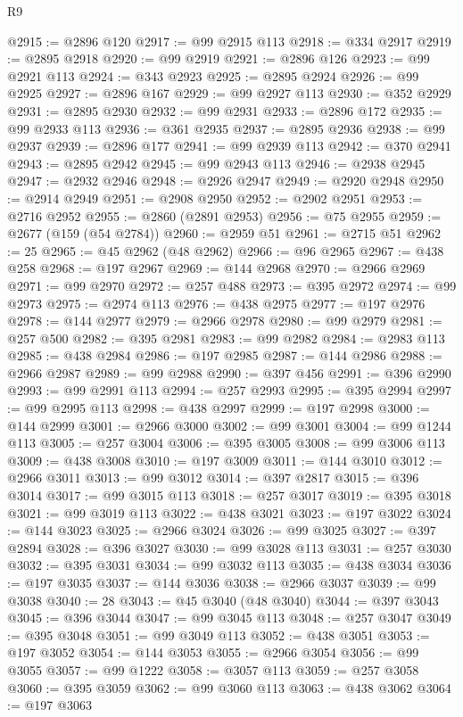 \begin{lexlean}{R9}
\begin{coremodule}
@2915 := @2896 @120
@2917 := @99 @2915 @113
@2918 := @334 @2917
@2919 := @2895 @2918
@2920 := @99 @2919
@2921 := @2896 @126
@2923 := @99 @2921 @113
@2924 := @343 @2923
@2925 := @2895 @2924
@2926 := @99 @2925
@2927 := @2896 @167
@2929 := @99 @2927 @113
@2930 := @352 @2929
@2931 := @2895 @2930
@2932 := @99 @2931
@2933 := @2896 @172
@2935 := @99 @2933 @113
@2936 := @361 @2935
@2937 := @2895 @2936
@2938 := @99 @2937
@2939 := @2896 @177
@2941 := @99 @2939 @113
@2942 := @370 @2941
@2943 := @2895 @2942
@2945 := @99 @2943 @113
@2946 := @2938 @2945
@2947 := @2932 @2946
@2948 := @2926 @2947
@2949 := @2920 @2948
@2950 := @2914 @2949
@2951 := @2908 @2950
@2952 := @2902 @2951
@2953 := @2716 @2952
@2955 := @2860 (@2891 @2953)
@2956 := @75 @2955
@2959 := @2677 (@159 (@54 @2784))
@2960 := @2959 @51
@2961 := @2715 @51
@2962 := 25
@2965 := @45 @2962 (@48 @2962)
@2966 := @96 @2965
@2967 := @438 @258
@2968 := @197 @2967
@2969 := @144 @2968
@2970 := @2966 @2969
@2971 := @99 @2970
@2972 := @257 @488
@2973 := @395 @2972
@2974 := @99 @2973
@2975 := @2974 @113
@2976 := @438 @2975
@2977 := @197 @2976
@2978 := @144 @2977
@2979 := @2966 @2978
@2980 := @99 @2979
@2981 := @257 @500
@2982 := @395 @2981
@2983 := @99 @2982
@2984 := @2983 @113
@2985 := @438 @2984
@2986 := @197 @2985
@2987 := @144 @2986
@2988 := @2966 @2987
@2989 := @99 @2988
@2990 := @397 @456
@2991 := @396 @2990
@2993 := @99 @2991 @113
@2994 := @257 @2993
@2995 := @395 @2994
@2997 := @99 @2995 @113
@2998 := @438 @2997
@2999 := @197 @2998
@3000 := @144 @2999
@3001 := @2966 @3000
@3002 := @99 @3001
@3004 := @99 @1244 @113
@3005 := @257 @3004
@3006 := @395 @3005
@3008 := @99 @3006 @113
@3009 := @438 @3008
@3010 := @197 @3009
@3011 := @144 @3010
@3012 := @2966 @3011
@3013 := @99 @3012
@3014 := @397 @2817
@3015 := @396 @3014
@3017 := @99 @3015 @113
@3018 := @257 @3017
@3019 := @395 @3018
@3021 := @99 @3019 @113
@3022 := @438 @3021
@3023 := @197 @3022
@3024 := @144 @3023
@3025 := @2966 @3024
@3026 := @99 @3025
@3027 := @397 @2894
@3028 := @396 @3027
@3030 := @99 @3028 @113
@3031 := @257 @3030
@3032 := @395 @3031
@3034 := @99 @3032 @113
@3035 := @438 @3034
@3036 := @197 @3035
@3037 := @144 @3036
@3038 := @2966 @3037
@3039 := @99 @3038
@3040 := 28
@3043 := @45 @3040 (@48 @3040)
@3044 := @397 @3043
@3045 := @396 @3044
@3047 := @99 @3045 @113
@3048 := @257 @3047
@3049 := @395 @3048
@3051 := @99 @3049 @113
@3052 := @438 @3051
@3053 := @197 @3052
@3054 := @144 @3053
@3055 := @2966 @3054
@3056 := @99 @3055
@3057 := @99 @1222
@3058 := @3057 @113
@3059 := @257 @3058
@3060 := @395 @3059
@3062 := @99 @3060 @113
@3063 := @438 @3062
@3064 := @197 @3063

\end{coremodule}
\end{lexlean}
